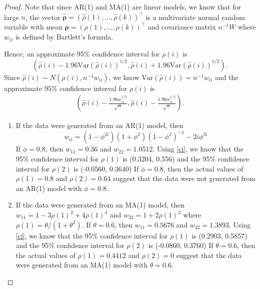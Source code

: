 \documentclass[12pt]{article}
\theoremstyle{definition}
\newcommand{\V}{\text{Var}}
\newcommand{\vect}[1]{\boldsymbol{#1}}
\begin{document}
\begin{proof}
  Note that since AR(1) and MA(1) are linear models, we know that for large $n$,
  the vector $\vect{\hat{\rho}} = (\hat{\rho}(1), \dots, \hat{\rho}(k))^\intercal$
  is a multivariate normal random variable with mean $\vect{\rho} = (\rho(1), \dots, \rho(k))^\intercal$
  and covariance matrix $n^{-1}W$ where $w_{ij}$ is defined by Bartlett's formula.

  Hence, an approximate 95\% confidence interval for
  $\rho(i)$ is
  \[
    \left(\hat{\rho}(i) - 1.96\V(\hat{\rho}(i))^{1/2}, \hat{\rho}(i) + 1.96\V(\hat{\rho}(i))^{1/2}\right).
  \]
  Since $\hat{\rho}(i) \sim N(\rho(i), n^{-1}w_{ii})$, we know $\V(\hat{\rho}(i)) = n^{-1}w_{ii}$ and the
  approximate 95\% confidence interval for $\rho(i)$ is
  \begin{align}\label{ci}
    \left(\hat{\rho}(i) - \frac{1.96w_{ii}^{1/2}}{\sqrt{n}}, \hat{\rho}(i) - \frac{1.96w_{ii}^{1/2}}{\sqrt{n}}\right).
  \end{align}
  \begin{enumerate}
    \item If the data were generated from an AR(1) model,
      then $$w_{ii} = (1 - \phi^{2i})(1 + \phi^2)(1 - \phi^2)^{-1} - 2i\phi^{2i}$$
      If $\phi = 0.8$, then $w_{11} = 0.36$ and $w_{22} = 1.0512$. Using \eqref{ci}, we know
      that the 95\% confidence interval for $\rho(1)$ is (0.3204, 0.556) and
      the 95\% confidence interval for $\rho(2)$ is (-0.0560, 0.3640)
      If $\phi = 0.8$, then the actual values of $\rho(1) = 0.8$ and $\rho(2) = 0.64$
      suggest that the data were not generated from an AR(1) model with
      $\phi = 0.8.$
    \item If the data were generated from an MA(1) model,
      then $w_{11} = 1 - 3 \rho(1)^2 + 4 \rho(1)^4$ and $w_{22} = 1 + 2 \rho(1)^2$ where $\rho(1) = \theta / (1 + \theta^2)$.
      If $\theta = 0.6$, then $w_{11} = 0.5676$ and $w_{22} = 1.3893$. Using \eqref{ci}, we know
      that the 95\% confidence interval for $\rho(1)$ is (0.2903, 0.5857) and
      the 95\% confidence interval for $\rho(2)$ is (-0.0860, 0.3760)
      If $\theta = 0.6$, then the actual values of $\rho(1) = 0.4412$ and $\rho(2) = 0$
      suggest that the data were generated from an MA(1) model with
      $\theta = 0.6.$
  \end{enumerate}
\end{proof}
\end{document}
